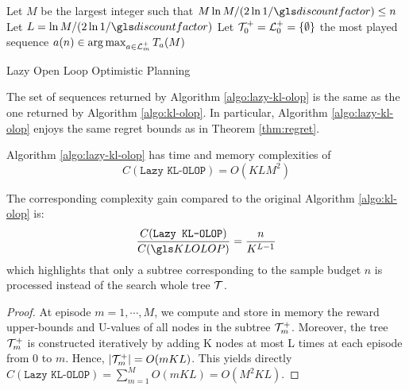 \begin{algorithm}[tp]
	\DontPrintSemicolon
	Let $M$ be the largest integer such that $M \log M/(2 \log 1/\discount) \leq n$\;
	Let $L = \log M / (2 \log 1/\discount)$\;
	Let $\mathcal{T}_0^+ = \mathcal{L}_0^+ = \{\emptyset\}$\;
	\Return the most played sequence $a(n) \in \operatorname*{arg\,max}_{a\in \mathcal{L}_m^+} T_a(M)$
	\caption{Lazy Open Loop Optimistic Planning}
	\label{algo:lazy-kl-olop}
\end{algorithm}

\begin{theorem}[Consistency]
	\label{thm:consistency}
	\begin{leftbar}[theorembar]
	The set of sequences returned by Algorithm \ref{algo:lazy-kl-olop} is the same as the one returned by Algorithm \ref{algo:kl-olop}.
	In particular, Algorithm \ref{algo:lazy-kl-olop} enjoys the same regret bounds as in Theorem \ref{thm:regret}.
	\end{leftbar}
\end{theorem}

\begin{proposition}
	\begin{leftbar}[propositionbar]
	Algorithm \ref{algo:lazy-kl-olop} has time and memory complexities of
	\begin{equation*}
	C(\texttt{Lazy KL-OLOP}) = O(KLM^2)
	\end{equation*}
	
	The corresponding complexity gain compared to the original Algorithm \ref{algo:kl-olop} is: 
	\begin{equation*}
	\frac{C(\texttt{Lazy KL-OLOP})}{C(\KLOLOP)} = \frac{n}{K^{L-1}}
	\end{equation*}
	which highlights that only a subtree corresponding to the sample budget $n$ is processed instead of the search whole tree $\mathcal{T}$.
	\end{leftbar}
\end{proposition}
\begin{proof}
	At episode $m = 1, \cdots, M$, we compute and store in memory the reward upper-bounds and U-values of all nodes in the subtree $\mathcal{T}_m^+$. Moreover, the tree $\mathcal{T}_m^+$ is constructed iteratively by adding K nodes at most L times at each episode from 0 to $m$. Hence, $|\mathcal{T}_m^+| = O(mKL)$.
	This yields directly $C(\texttt{Lazy KL-OLOP}) = \sum_{m=1}^M O(mKL) = O(M^2KL)$.
\end{proof}

